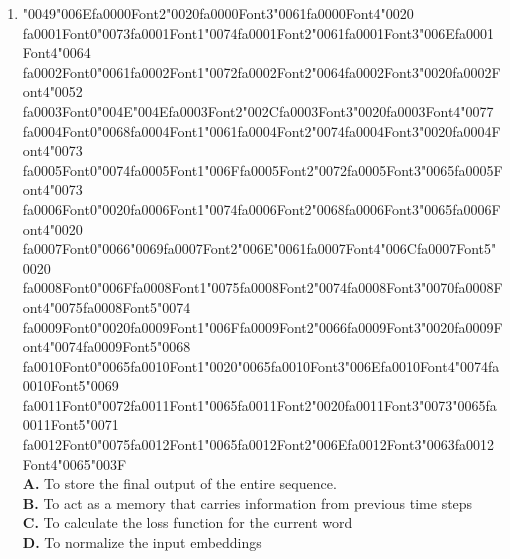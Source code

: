 \documentclass[11pt]{article}
\begin{document}
\begin{enumerate}[label=Q\arabic*., leftmargin=*]
\item {\char"0049}{\char"006E}{\csname fa0000Font2\endcsname\char"0020}{\csname fa0000Font3\endcsname\char"0061}{\csname fa0000Font4\endcsname\char"0020} {\csname fa0001Font0\endcsname\char"0073}{\csname fa0001Font1\endcsname\char"0074}{\csname fa0001Font2\endcsname\char"0061}{\csname fa0001Font3\endcsname\char"006E}{\csname fa0001Font4\endcsname\char"0064} {\csname fa0002Font0\endcsname\char"0061}{\csname fa0002Font1\endcsname\char"0072}{\csname fa0002Font2\endcsname\char"0064}{\csname fa0002Font3\endcsname\char"0020}{\csname fa0002Font4\endcsname\char"0052} {\csname fa0003Font0\endcsname\char"004E}{\char"004E}{\csname fa0003Font2\endcsname\char"002C}{\csname fa0003Font3\endcsname\char"0020}{\csname fa0003Font4\endcsname\char"0077} {\csname fa0004Font0\endcsname\char"0068}{\csname fa0004Font1\endcsname\char"0061}{\csname fa0004Font2\endcsname\char"0074}{\csname fa0004Font3\endcsname\char"0020}{\csname fa0004Font4\endcsname\char"0073} {\csname fa0005Font0\endcsname\char"0074}{\csname fa0005Font1\endcsname\char"006F}{\csname fa0005Font2\endcsname\char"0072}{\csname fa0005Font3\endcsname\char"0065}{\csname fa0005Font4\endcsname\char"0073} {\csname fa0006Font0\endcsname\char"0020}{\csname fa0006Font1\endcsname\char"0074}{\csname fa0006Font2\endcsname\char"0068}{\csname fa0006Font3\endcsname\char"0065}{\csname fa0006Font4\endcsname\char"0020} {\csname fa0007Font0\endcsname\char"0066}{\char"0069}{\csname fa0007Font2\endcsname\char"006E}{\char"0061}{\csname fa0007Font4\endcsname\char"006C}{\csname fa0007Font5\endcsname\char"0020} {\csname fa0008Font0\endcsname\char"006F}{\csname fa0008Font1\endcsname\char"0075}{\csname fa0008Font2\endcsname\char"0074}{\csname fa0008Font3\endcsname\char"0070}{\csname fa0008Font4\endcsname\char"0075}{\csname fa0008Font5\endcsname\char"0074} {\csname fa0009Font0\endcsname\char"0020}{\csname fa0009Font1\endcsname\char"006F}{\csname fa0009Font2\endcsname\char"0066}{\csname fa0009Font3\endcsname\char"0020}{\csname fa0009Font4\endcsname\char"0074}{\csname fa0009Font5\endcsname\char"0068} {\csname fa0010Font0\endcsname\char"0065}{\csname fa0010Font1\endcsname\char"0020}{\char"0065}{\csname fa0010Font3\endcsname\char"006E}{\csname fa0010Font4\endcsname\char"0074}{\csname fa0010Font5\endcsname\char"0069} {\csname fa0011Font0\endcsname\char"0072}{\csname fa0011Font1\endcsname\char"0065}{\csname fa0011Font2\endcsname\char"0020}{\csname fa0011Font3\endcsname\char"0073}{\char"0065}{\csname fa0011Font5\endcsname\char"0071} {\csname fa0012Font0\endcsname\char"0075}{\csname fa0012Font1\endcsname\char"0065}{\csname fa0012Font2\endcsname\char"006E}{\csname fa0012Font3\endcsname\char"0063}{\csname fa0012Font4\endcsname\char"0065}{\char"003F}\\[0.25em]
\textbf{A.} To store the final output of the entire sequence.\\
\textbf{B.} To act as a memory that carries information from previous time steps\\
\textbf{C.} To calculate the loss function for the current word\\
\textbf{D.} To normalize the input embeddings


\end{enumerate}
\end{document}
